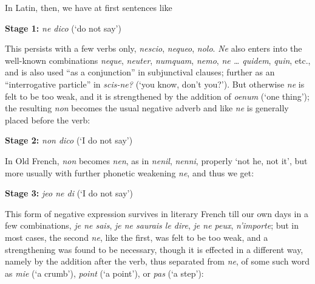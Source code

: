 \label{para:negativebeforeverb}In Latin, %
then, we have at first sentences like\largerpage

\bigskip

\textbf{Stage 1:} \textit{ne dico} \phantom{x} (`do not say')

\bigskip

This persists with a few verbs only, \textit{nescio}, \textit{nequeo}, \textit{nolo}. \textit{Ne} also enters into the well-known combinations \textit{neque}, \textit{neuter}, \textit{numquam}, \textit{nemo}, \textit{ne {\dots} quidem}, \textit{quin}, etc., and is also used ``as a conjunction'' in subjunctival clauses; further as an ``interrogative particle'' in \textit{scis-ne?} (`you know, don't you?'). But otherwise \textit{ne} is felt to be too weak, and it is strengthened by the addition of \textit{oenum} (`one thing'); the resulting \textit{non} becomes the usual negative adverb and like \textit{ne} is generally placed before the verb:

\bigskip

\textbf{Stage 2:} \textit{non dico} \phantom{x} (`I do not say')

\bigskip

In Old French, \textit{non} becomes \textit{nen}, as in \textit{nenil}, \textit{nenni}, properly `not he, not it', but more usually with further phonetic weakening \textit{ne}, and thus we get:

\bigskip

\textbf{Stage 3:} \textit{jeo ne di} \phantom{x} (`I do not say')
\bigskip

This form of negative expression survives in literary French till our own days in a few combinations, \textit{je ne sais}, \textit{je ne saurais le dire}, \textit{je ne peux}, \textit{n'importe}; but in most cases, the second \textit{ne}, like the first, was felt to be too weak, and a strengthening was found to be necessary, though it is effected in a different way, namely by the addition after the verb, thus separated from \textit{ne}, of some such word as \textit{mie} (`a crumb'), \textit{point} (`a point'), or \textit{pas} (`a step'):

